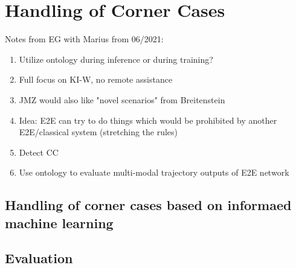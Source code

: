 \chapter{Handling of Corner Cases}
\label{chap:handling}

Notes from EG with Marius from 06/2021:
\begin{enumerate}
    \item Utilize ontology during inference or during training?
    \item Full focus on KI-W, no remote assistance
    \item JMZ would also like "novel scenarios" from Breitenstein
    \item Idea: E2E can try to do things which would be prohibited by another E2E/classical system (stretching the rules)
    \item Detect CC
    \item Use ontology to evaluate multi-modal trajectory outputs of E2E network
\end{enumerate}

\section{Handling of corner cases based on informaed machine learning}
\label{sec:sensorik}

\section{Evaluation}

